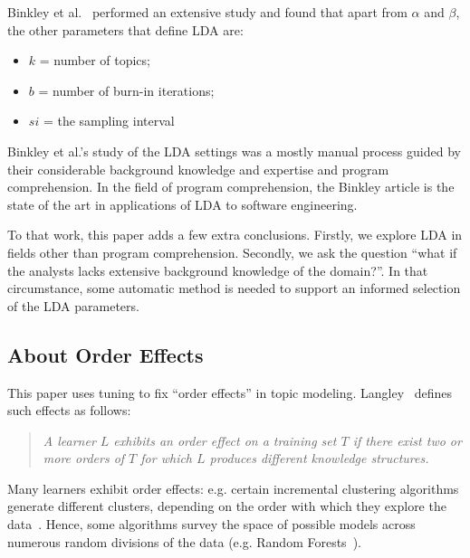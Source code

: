 \documentclass[twocolumn,5p,sort&compress]{elsarticle}
\newcommand{\bi}{\begin{itemize}}
\newcommand{\ei}{\end{itemize}}
\theoremstyle{break}
\begin{document}
Binkley et al.~\cite{binkley2014understanding} performed an extensive study and found that 
apart from $\alpha$ and $\beta$, the other parameters that define LDA
are:
\bi
\item $k$ = number of topics;
\item $b$ = number of burn-in iterations;
\item $si$ = the sampling interval
\ei
Binkley et al.'s study of the LDA settings was a mostly manual process
guided by their considerable background knowledge and expertise and program
comprehension.
In the field of program comprehension, the Binkley article
is the state of the art in applications of LDA to software engineering.

To that work, this paper adds a few extra conclusions.
Firstly, we explore LDA in fields other than program comprehension.
Secondly, we ask the question ``what if the analysts lacks extensive background knowledge
of the domain?''. In that circumstance, some automatic method is needed to support
an informed selection of the LDA parameters.

 


\subsection{About Order Effects}

\noindent
This paper uses tuning to fix ``order effects'' in topic modeling. Langley~\cite{GENNARI198911} defines such effects as follows:
\begin{quote}
{\em A learner $L$ exhibits an order effect on a training set  $T$ if there exist
two or more orders of $T$ for which $L$ produces different knowledge structures.}
\end{quote}
Many learners exhibit order effects: e.g. certain incremental clustering algorithms generate different
clusters, depending on the order with which they explore the data~\cite{GENNARI198911}.
Hence, some algorithms survey the space of possible models across numerous
random divisions of the data (e.g. Random Forests~\cite{Breiman2001}).
\end{document}

